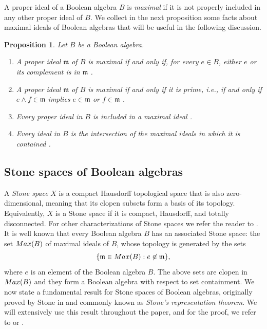 \documentclass[11pt]{amsart}
\def\m{{\mathfrak m}} %
\newtheorem{proposition}[theorem]{Proposition}
\theoremstyle{definition}
\begin{document}
A proper ideal of a Boolean algebra $B$ is {\it maximal} if it is not properly included in any other proper ideal of $B$.
We collect in the next proposition some facts about maximal ideals of Boolean algebras that will be useful in the following discussion.

\begin{proposition}\label{prop: max ideals} Let $B$ be a Boolean algebra.
\begin{enumerate}[label=\textup{(\arabic{*})}, mode=unboxed]
    \item\label{prop: max ideals 1} A proper ideal $\m$ of $B$ is maximal if and only if, for every $e\in B$, either $e$ or its complement is in $\m$ {\cite[Lemma 1, p.~171]{GiHa09}}.

    \item\label{prop: max ideals 2} A proper ideal $\m$ of $B$ is maximal if and only if it is prime, i.e., if and only if $e\wedge f\in \m$ implies $e\in\m$ or $f\in \m$ {\cite[Corollary 1, p.~172]{GiHa09}}.

    \item\label{prop: max ideals 3} Every proper ideal in $B$ is included in a maximal ideal {\cite[Theorem 12, p.~172]{GiHa09}}.

    \item\label{prop: max ideals 4} Every ideal in $B$ is the intersection of the maximal ideals in which it is contained {\cite[Exercise 3, p.~174]{GiHa09}}.
\end{enumerate}
    
\end{proposition}

\subsection{Stone spaces of Boolean algebras}\label{subsec: Stone spaces} A {\it Stone space} $X$ is a compact Hausdorff topological space that is also zero-dimensional, meaning that its clopen subsets form a basis of its topology. Equivalently, $X$ is a Stone space if it is compact, Hausdorff, and totally disconnected. For other characterizations of Stone spaces we refer the reader to \cite[Chapter II.4]{Joh86}. It is well known \cite{Sto36} that every Boolean algebra $B$ has an associated Stone space: the set  ${\rm Max}(B)$ of  maximal ideals of $B$, whose topology is generated by the sets
$$\{\m\in {\rm Max}(B) : e\not\in \m\},$$
where $e$ is an element of the Boolean algebra $B$. The above sets are clopen in ${\rm Max}(B)$ and they form a Boolean algebra with respect to set containment. We now state a fundamental result for Stone spaces of Boolean algebras, originally proved by Stone in \cite{Sto36} and commonly known as {\it Stone's representation theorem}. We will extensively use this result throughout the paper, and for the proof, we refer to \cite{Sto36} or \cite[Chapter II.4]{Joh86}. 
\end{document}
